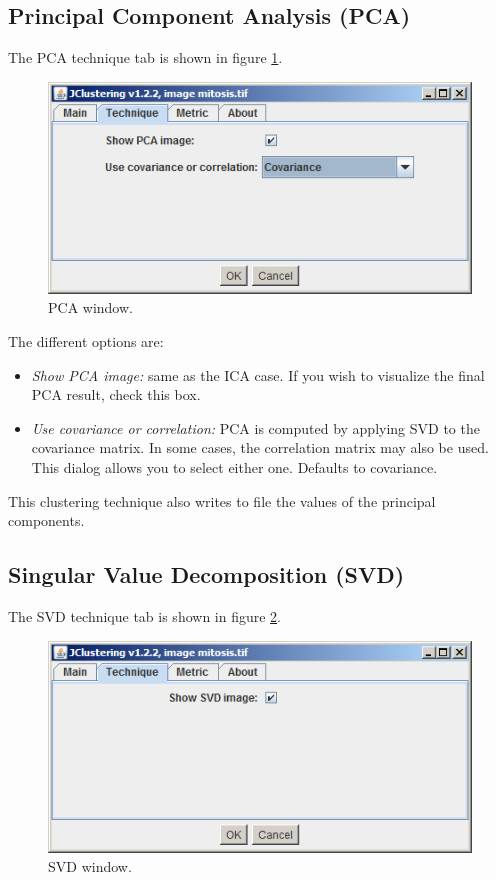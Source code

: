 \documentclass[11pt]{article} %
\begin{document}
\subsection{Principal Component Analysis (PCA)}

The PCA technique tab is shown in figure \ref{fig:pca_window}.

\begin{figure}[h!]
  \centering
    \includegraphics[width=\textwidth]{figures/pca_window}
  \caption{PCA window.}
  \label{fig:pca_window}
\end{figure}

The different options are:

\begin{itemize}
\item {\em Show PCA image:} same as the ICA case. If you wish to visualize the final PCA result, check this box.
\item {\em Use covariance or correlation:} PCA is computed by applying SVD to the covariance matrix. In some cases, the
correlation matrix may also be used. This dialog allows you to select either one. Defaults to covariance.
\end{itemize}

This clustering technique also writes to file the values of the principal components.

\subsection{Singular Value Decomposition (SVD)}

The SVD technique tab is shown in figure \ref{fig:svd_window}.

\begin{figure}[h!]
  \centering
    \includegraphics[width=\textwidth]{figures/svd_window}
  \caption{SVD window.}
  \label{fig:svd_window}
\end{figure}
\end{document}
